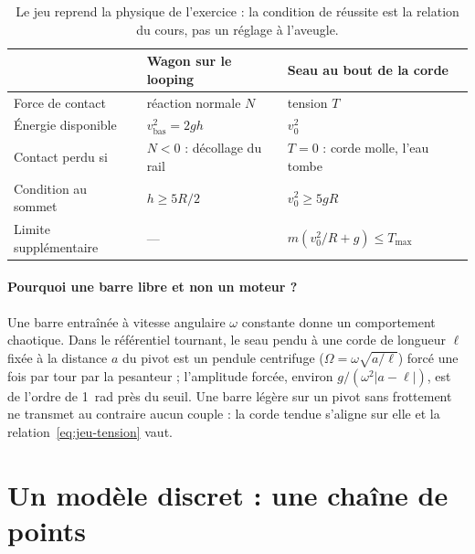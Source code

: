 \begin{table}[ht]
  \centering\small
  \begin{tabular}{@{}lll@{}}
    \toprule
    & Wagon sur le looping & Seau au bout de la corde \\
    \midrule
    Force de contact & réaction normale \(N\) & tension \(T\) \\
    Énergie disponible & \(v_{\text{bas}}^2 = 2 g h\) & \(v_0^2\) \\
    Contact perdu si & \(N < 0\) : décollage du rail & \(T = 0\) : corde molle, l'eau tombe \\
    Condition au sommet & \(h \geq 5R/2\) & \(v_0^2 \geq 5 g R\) \\
    Limite supplémentaire & --- & \(m (v_0^2/R + g) \leq T_{\max}\) \\
    \bottomrule
  \end{tabular}
  \caption{Le jeu reprend la physique de l'exercice : la condition de réussite est
    la relation du cours, pas un réglage à l'aveugle.}
  \label{tab:jeu-analogie}
\end{table}

\paragraph{Pourquoi une barre libre et non un moteur ?} Une barre entraînée à
vitesse angulaire \(\omega\) constante donne un comportement chaotique. Dans le
référentiel tournant, le seau pendu à une corde de longueur \(\ell\) fixée à la
distance \(a\) du pivot est un pendule centrifuge (\(\Omega = \omega \sqrt{a/\ell}\))
forcé une fois par tour par la pesanteur ; l'amplitude forcée, environ
\(g / (\omega^2 |a - \ell|)\), est de l'ordre de \SI{1}{rad} près du seuil. Une barre
légère sur un pivot sans frottement ne transmet au contraire aucun couple : la
corde tendue s'aligne sur elle et la relation~\eqref{eq:jeu-tension} vaut.

\section{Un modèle discret : une chaîne de points}

